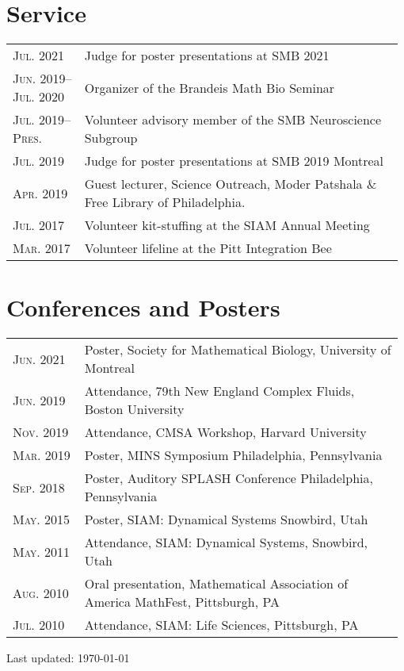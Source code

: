 \documentclass[a4paper,10pt]{article}
\newcommand{\updateinfo}[1][\today]{\par\vfill\hfill{\scriptsize\color{gray}Last updated: #1}}
\begin{document}
\section{Service}
\begin{tabular}{p{0.18\linewidth}p{0.8\linewidth}}
\textsc{Jul. 2021} & Judge for poster presentations at SMB 2021\\
\textsc{Jun. 2019--Jul. 2020} & Organizer of the Brandeis Math Bio Seminar\\
\textsc{Jul. 2019--Pres.} & Volunteer advisory member of the SMB Neuroscience Subgroup\\
\textsc{Jul. 2019} & Judge for poster presentations at SMB 2019 Montreal\\
\textsc{Apr. 2019} & Guest lecturer, Science Outreach, Moder Patshala \& Free Library of Philadelphia.\\
\textsc{Jul. 2017} & Volunteer kit-stuffing at the SIAM Annual Meeting\\
\textsc{Mar. 2017} & Volunteer lifeline at the Pitt Integration Bee
\end{tabular}

\section{Conferences and Posters}
\begin{longtable}{p{0.18\linewidth}p{0.8\linewidth}}
\textsc{Jun.} 2021 & Poster, Society for Mathematical Biology, University of Montreal\\
\textsc{Jun.} 2019 & Attendance, 79th New England Complex Fluids, Boston University\\
\textsc{Nov.} 2019 & Attendance, CMSA Workshop, Harvard University\\
\textsc{Mar.} 2019 & Poster, MINS Symposium Philadelphia, Pennsylvania\\
\textsc{Sep.} 2018 & Poster, Auditory SPLASH Conference Philadelphia, Pennsylvania\\
\textsc{May.} 2015 & Poster, SIAM: Dynamical Systems Snowbird, Utah\\
\textsc{May.} 2011 & Attendance, SIAM: Dynamical Systems, Snowbird, Utah\\
\textsc{Aug.} 2010 & Oral presentation, Mathematical Association of America MathFest, Pittsburgh, PA\\
\textsc{Jul.} 2010 & Attendance, SIAM: Life Sciences, Pittsburgh, PA
\end{longtable}


\updateinfo
\vspace{-.2in}
\end{document}
